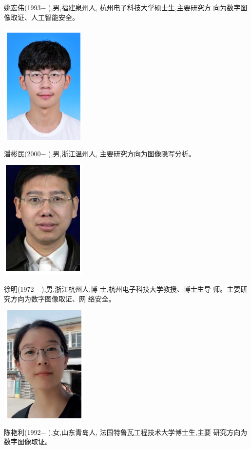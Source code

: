 \documentclass{article}
\begin{document}
姚宏伟(1993− ),男,福建泉州人, 杭州电子科技大学硕士生,主要研究方 向为数字图像取证、人工智能安全。


\includegraphics{_page_15_Picture_19.png}


潘彬民(2000− ),男,浙江温州人, 主要研究方向为图像隐写分析。


\includegraphics{_page_15_Picture_21.png}


徐明(1972− ),男,浙江杭州人,博 士,杭州电子科技大学教授、博士生导 师。主要研究方向为数字图像取证、网 络安全。


\includegraphics{_page_15_Picture_23.png}


陈艳利(1992− ),女,山东青岛人, 法国特鲁瓦工程技术大学博士生,主要 研究方向为数字图像取证。
\end{document}
